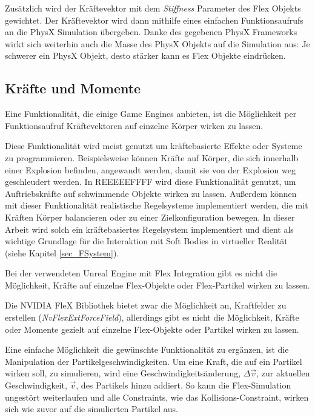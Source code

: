 Zusätzlich wird der Kräftevektor mit dem \textit{Stiffness} Parameter des Flex Objekts gewichtet.
Der Kräftevektor wird dann mithilfe eines einfachen Funktionsaufrufs an die PhysX Simulation übergeben. Danke des gegebenen PhysX Frameworks wirkt sich weiterhin auch die Masse des PhysX Objekts auf die Simulation aus: Je schwerer ein PhysX Objekt, desto stärker kann es Flex Objekte eindrücken.

\subsection{Kräfte und Momente}

Eine Funktionalität, die einige Game Engines anbieten, ist die Möglichkeit per Funktionsaufruf Kräftevektoren auf einzelne Körper wirken zu lassen. 

Diese Funktionalität wird meist genutzt um kräftebasierte Effekte oder Systeme zu programmieren. Beispielsweise können Kräfte auf Körper, die sich innerhalb einer Explosion befinden, angewandt werden, damit sie von der Explosion weg geschleudert werden. In REEEEEFFFF wird diese Funktionalität genutzt, um Auftriebskräfte auf schwimmende Objekte wirken zu lassen. 
Außerdem können mit dieser Funktionalität realistische Regelsysteme implementiert werden, die mit Kräften Körper balancieren oder zu einer Zielkonfiguration bewegen. In dieser Arbeit wird solch ein kräftebasiertes Regelsystem implementiert und dient als wichtige Grundlage für die Interaktion mit Soft Bodies in virtueller Realität (siehe Kapitel \ref{sec_FSystem}).

Bei der verwendeten Unreal Engine mit Flex Integration gibt es nicht die Möglichkeit, Kräfte auf einzelne Flex-Objekte oder Flex-Partikel wirken zu lassen.

Die NVIDIA FleX Bibliothek bietet zwar die Möglichkeit an, Kraftfelder zu erstellen (\textit{NvFlexExtForceField}), allerdings gibt es nicht die Möglichkeit, Kräfte oder Momente gezielt auf einzelne Flex-Objekte oder Partikel wirken zu lassen. %

Eine einfache Möglichkeit die gewünschte Funktionalität zu ergänzen, ist die Manipulation der Partikelgeschwindigkeiten. Um eine Kraft, die auf ein Partikel wirken soll, zu simulieren, wird eine Geschwindigkeitsänderung, $\Delta\vec{v}$, zur aktuellen Geschwindigkeit, $\vec{v}$, des Partikels hinzu addiert. So kann die Flex-Simulation ungestört weiterlaufen und alle Constraints, wie das Kollisions-Constraint, wirken sich wie zuvor auf die simulierten Partikel aus.

